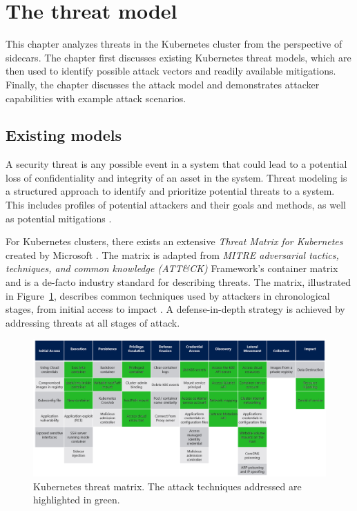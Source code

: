 \documentclass[english, 12pt, a4paper, sci, utf8, a-2b, online]{aaltothesis}
\begin{document}
\section{The threat model} \label{sec:threats}

This chapter analyzes threats in the Kubernetes cluster from the perspective of sidecars.
The chapter first discusses existing Kubernetes threat models, which are then used to identify possible attack vectors and readily available mitigations.
Finally, the chapter discusses the attack model and demonstrates attacker capabilities with example attack scenarios.

\subsection{Existing models}

A security threat is any possible event in a system that could lead to a potential loss of confidentiality and integrity of an asset in the system.
Threat modeling is a structured approach to identify and prioritize potential threats to a system.
This includes profiles of potential attackers and their goals and methods, as well as potential mitigations \cite{shevchenko2018threat}.

For Kubernetes clusters, there exists an extensive \emph{Threat Matrix for Kubernetes} created by Microsoft \cite{k8s-threat-matrix}.
The matrix is adapted from \emph{MITRE adversarial tactics, techniques, and common knowledge (ATT\&CK)} Framework's container matrix \cite{mitre-matrix} and is a de-facto industry standard for describing threats.
The matrix, illustrated in Figure~\ref{fig:threat-matrix}, describes common techniques used by attackers in chronological stages, from initial access to impact \cite{minna2021understanding}.
A defense-in-depth strategy is achieved by addressing threats at all stages of attack.

\begin{figure}[h!]
  \centering
  \includegraphics[width=\linewidth]{files/Matrix.png}
  \caption{Kubernetes threat matrix. The attack techniques addressed are highlighted in green.}
  \label{fig:threat-matrix}
\end{figure}
\end{document}
